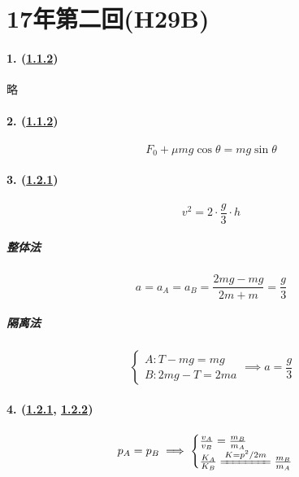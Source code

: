 
\section{17年第二回(H29B)}

\paragraph{1. (\hyperref[subsec:1.1.2]{1.1.2})} 略
\paragraph{2. (\hyperref[subsec:1.1.2]{1.1.2})}

\begin{equation*}
    F_0+\mu mg\cos\theta=mg\sin\theta
\end{equation*}

\paragraph{3. (\hyperref[subsec:1.2.1]{1.2.1})}

\begin{equation*}
    v^2=2\cdot\frac{g}{3}\cdot h
\end{equation*}

\subparagraph{整体法}

\begin{equation*}
    a=a_A=a_B=\frac{2mg-mg}{2m+m}=\frac{g}{3}
\end{equation*}

\subparagraph{隔离法}

\begin{equation*}
    \begin{cases}
        A: T-mg=mg\\
        B: 2mg-T=2ma
    \end{cases}\implies
    a=\frac{g}{3}
\end{equation*}

\paragraph{4. (\hyperref[subsec:1.2.1]{1.2.1}, \hyperref[subsec:1.2.2]{1.2.2})}

\begin{gather*}
    p_A=p_B\implies
    \begin{cases}
        \frac{v_A}{v_B}=\frac{m_B}{m_A}\\
        \frac{K_A}{K_B}\xlongequal{K=p^2/2m}\frac{m_B}{m_A}
    \end{cases}
\end{gather*}

